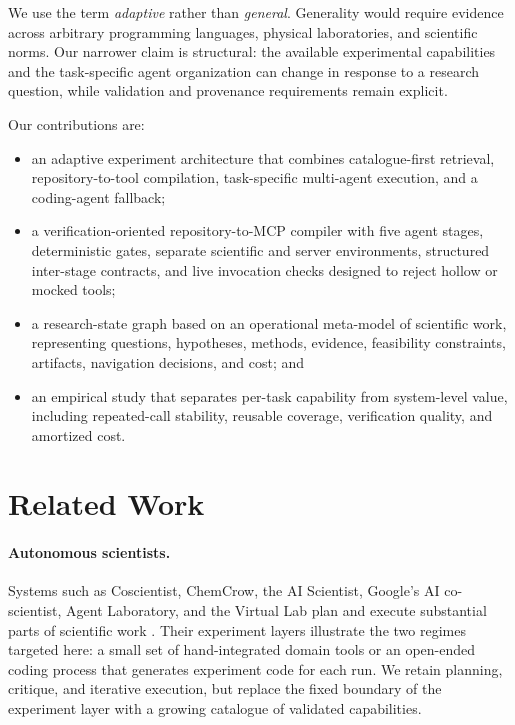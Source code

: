 \documentclass[letterpaper]{article} %
\begin{document}
We use the term \emph{adaptive} rather than \emph{general}. Generality would require evidence across arbitrary programming languages, physical laboratories, and scientific norms. Our narrower claim is structural: the available experimental capabilities and the task-specific agent organization can change in response to a research question, while validation and provenance requirements remain explicit.

Our contributions are:
\begin{itemize}
    \item an adaptive experiment architecture that combines catalogue-first retrieval, repository-to-tool compilation, task-specific multi-agent execution, and a coding-agent fallback;
    \item a verification-oriented repository-to-MCP compiler with five agent stages, deterministic gates, separate scientific and server environments, structured inter-stage contracts, and live invocation checks designed to reject hollow or mocked tools;
    \item a research-state graph based on an operational meta-model of scientific work, representing questions, hypotheses, methods, evidence, feasibility constraints, artifacts, navigation decisions, and cost; and
    \item an empirical study that separates per-task capability from system-level value, including repeated-call stability, reusable coverage, verification quality, and amortized cost.
\end{itemize}

\section{Related Work}

\paragraph{Autonomous scientists.}
Systems such as Coscientist, ChemCrow, the AI Scientist, Google's AI co-scientist, Agent Laboratory, and the Virtual Lab plan and execute substantial parts of scientific work \citep{boiko2023autonomous,bran2024chemcrow,lu2024aiscientist,google2025coscientist,schmidgall2025agentlab,swanson2025virtuallab}. Their experiment layers illustrate the two regimes targeted here: a small set of hand-integrated domain tools or an open-ended coding process that generates experiment code for each run. We retain planning, critique, and iterative execution, but replace the fixed boundary of the experiment layer with a growing catalogue of validated capabilities.
\end{document}
